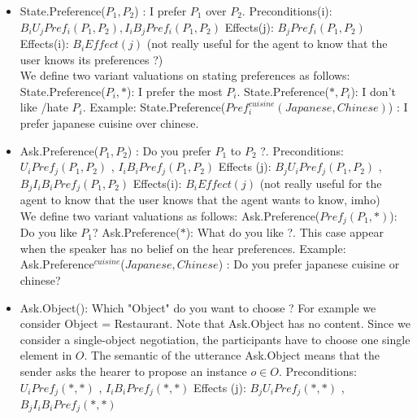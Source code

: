 \documentclass{llncs}
\begin{document}

 \begin{itemize}
 \item State.Preference(\textit{$P_{1}, P_{2}$}) : I prefer $P_{1}$ over $P_{2}$.
	 \subitem Preconditions(i):  $ B_{i} U_{j} Pref_{i}(P_{1}, P_{2}), I_{i} B_{j} Pref_{i}(P_{1}, P_{2})$
	 \subitem Effects(j): $ B_{j} Pref_{i}(P_{1}, P_{2})$
	 \subitem Effects(i): $ B_i Effect(j)$ (not really useful for the agent to know that the user knows its preferences ?)
	 \\ We define two variant valuations on stating preferences as follows: 
	 \subitem State.Preference(\textit{$P_{i}, *$}): I prefer the most $P_{i}$.
	 \subitem State.Preference(\textit{$*, P_{i}$}): I don't like /hate $P_{i}$.
	 \subitem Example: State.Preference(\textit{$Pref_{i}^{cuisine} (Japanese , Chinese)$}) : I prefer japanese cuisine over chinese.

 \item Ask.Preference(\textit{$P_{1}, P_{2}$}) : Do you prefer $P_{1}$ to $P_{2}$ ?. 
	  \subitem Preconditions:  $ U_{i} Pref_{j}(P_{1}, P_{2})$ ,  $ I_{i} B_{i} Pref_{j}(P_{1}, P_{2})$
	  \subitem Effects (j):  $B_{j} U_{i} Pref_{j}(P_{1}, P_{2})$ ,  $ B_{j} I_{i} B_{i}Pref_{j}(P_{1}, P_{2})$
	  \subitem Effects(i): $ B_i Effect(j)$ (not really useful for the agent to know that the user knows that the agent wants to know, imho)
	 \\We define two variant valuations as follows: 
	 \subitem Ask.Preference(\textit{$Pref_{j}(P_{1}, *)$}): Do you like $P_{1}$?
	 \subitem Ask.Preference(\textit{$*$}): What do you like ?. This case appear when the speaker has no belief on the hear preferences. 
	 \subitem Example: Ask.Preference$^{cuisine}$(\textit{$Japanese , Chinese$}) : Do you prefer japanese cuisine or chinese?

 \item Ask.Object(): Which "Object" do you want to choose ? For example we consider Object = Restaurant. Note that Ask.Object has no content. Since we consider a single-object negotiation, the participants have to choose one single element in $O$. The semantic of the utterance Ask.Object means that the sender asks the hearer to propose an instance $o\in O$.
	\subitem Preconditions:  $ U_{i} Pref_{j}(*,*)$ ,  $ I_{i} B_{i} Pref_{j}(*,*)$
  	\subitem Effects (j):  $B_{j} U_{i} Pref_{j}(*, *)$ ,  $ B_{j} I_{i} B_{i}Pref_{j}(*,*)$
 

\end{itemize}
\end{document}
